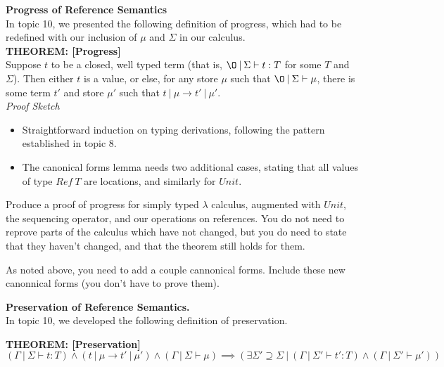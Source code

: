 \documentclass{exam}
\begin{document}
\begin{center}
\end{center}

\begin{questions}


\question[12] \textbf{Progress of Reference Semantics} \\
In topic 10, we presented the following definition of progress, which had to be redefined with our inclusion of $\mu$ and $\Sigma$ in our calculus.   \\

\textbf{THEOREM: [Progress]} \\ 
Suppose $t$ to be a closed, well typed term (that is, $\O \:|\: \Sigma \vdash t : T$ for some $T$ and $\Sigma$).  Then either $t$ is a value, or else, for any store $\mu$ such that $\O \:|\:\Sigma \vdash \mu$, there is some term $t'$ and store $\mu'$ such that $t\:|\:\mu \rightarrow t'\:|\:\mu'$. \\

\emph{Proof Sketch}
\begin{itemize}
\item Straightforward induction on typing derivations, following the pattern established in topic 8.  
\item The canonical forms lemma needs two additional cases, stating that all values of type $Ref\:T$ are locations, and similarly for $Unit$.
\end{itemize}

Produce a proof of progress for simply typed $\lambda$ calculus, augmented with $Unit$, the sequencing operator, and our operations on references.  You do not need to reprove parts of the calculus which have not changed, but you do need to state that they haven't changed, and that the theorem still holds for them.

As noted above, you need to add a couple cannonical forms.  Include these new canonnical forms (you don't have to prove them).  

\question[14] \textbf{Preservation of Reference Semantics.} \\
In topic 10, we developed the following definition of preservation.

\textbf{THEOREM: [Preservation]} \\
\begin{equation}
(\Gamma \:|\:\Sigma \vdash t : T) \land (t\:|\:\mu \rightarrow t'\:|\:\mu') \land (\Gamma \:|\:\Sigma \vdash \mu) \implies (\exists \Sigma' \supseteq \Sigma \:|\: (\Gamma\:|\:\Sigma' \vdash t' : T) \land (\Gamma\:|\:\Sigma' \vdash \mu') )
\end{equation}


\end{questions}
\end{document}
